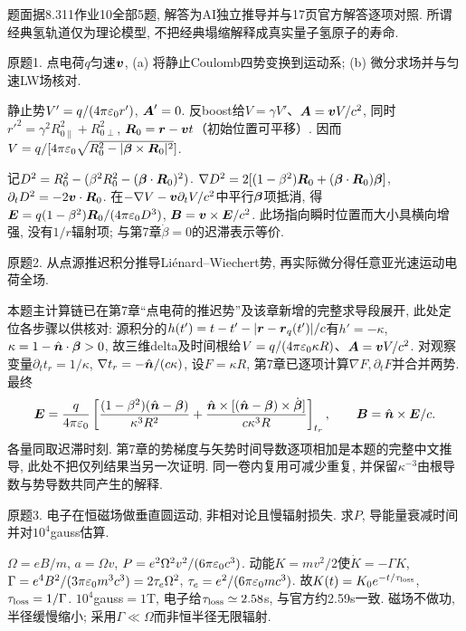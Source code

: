 题面据8.311作业10全部5题, 解答为AI独立推导并与17页官方解答逐项对照. 所谓经典氢轨道仅为理论模型, 不把经典塌缩解释成真实量子氢原子的寿命.
\begin{exercise}
原题1. 点电荷$q$匀速$\boldsymbol{v}$, (a) 将静止Coulomb四势变换到运动系; (b) 微分求场并与匀速LW场核对.
\end{exercise}
\begin{solution}
静止势$V'=q/(4\pi\varepsilon_0 r')$, $\boldsymbol{A}'=0$. 反boost给$V=\gamma V'$、$\boldsymbol{A}=\boldsymbol{v} V/c^2$, 同时$r'^2=\gamma^2R_{0\parallel}^2+R_{0\perp}^2$, $\boldsymbol{R}_0=\boldsymbol{r}-\boldsymbol{v}t$（初始位置可平移）. 因而$V=q/[4\pi\varepsilon_0\sqrt{R_0^2-|\boldsymbol{\beta}\times\boldsymbol{R}_0|^2}]$.

记$D^2=R_0^2-(\beta^2R_0^2-(\boldsymbol{\beta}\cdot\boldsymbol{R}_0)^2)$. $\nabla D^2=2[(1-\beta^2)\boldsymbol{R}_0+(\boldsymbol{\beta}\cdot\boldsymbol{R}_0)\boldsymbol{\beta}]$, $\partial_tD^2=-2\boldsymbol{v}\cdot\boldsymbol{R}_0$. 在$-\nabla V-\boldsymbol{v}\partial_tV/c^2$中平行$\boldsymbol{\beta}$项抵消, 得$\boldsymbol{E}=q(1-\beta^2)\boldsymbol{R}_0/(4\pi\varepsilon_0 D^3)$, $\boldsymbol{B}=\boldsymbol{v}\times\boldsymbol{E}/c^2$. 此场指向瞬时位置而大小具横向增强, 没有$1/r$辐射项; 与第7章$\dot\beta=0$的迟滞表示等价.
\end{solution}
\begin{exercise}
原题2. 从点源推迟积分推导Liénard--Wiechert势, 再实际微分得任意亚光速运动电荷全场.
\end{exercise}
\begin{solution}
本题主计算链已在第7章“点电荷的推迟势”及该章新增的完整求导段展开, 此处定位各步骤以供核对: 源积分的$h(t')=t-t'-|\boldsymbol{r}-\boldsymbol{r}_q(t')|/c$有$h'=-\kappa$, $\kappa=1-\hat{\boldsymbol{n}}\cdot\boldsymbol{\beta}>0$, 故三维delta及时间根给$V=q/(4\pi\varepsilon_0\kappa R)$、$\boldsymbol{A}=\boldsymbol{v}V/c^2$. 对观察变量$\partial_tt_r=1/\kappa$, $\nabla t_r=-\hat{\boldsymbol{n}}/(c\kappa)$, 设$F=\kappa R$, 第7章已逐项计算$\nabla F,\partial_tF$并合并两势. 最终
\[
\boldsymbol{E}=\frac q{4\pi\varepsilon_0}\left[\frac{(1-\beta^2)(\hat{\boldsymbol{n}}-\boldsymbol{\beta})}{\kappa^3R^2}+\frac{\hat{\boldsymbol{n}}\times[(\hat{\boldsymbol{n}}-\boldsymbol{\beta})\times\dot{\boldsymbol{\beta}}]}{c\kappa^3R}\right]_{t_r},\qquad\boldsymbol{B}=\hat{\boldsymbol{n}}\times\boldsymbol{E}/c.
\]
各量同取迟滞时刻. 第7章的势梯度与矢势时间导数逐项相加是本题的完整中文推导, 此处不把仅列结果当另一次证明. 同一卷内复用可减少重复, 并保留$\kappa^{-3}$由根导数与势导数共同产生的解释.
\end{solution}
\begin{exercise}
原题3. 电子在恒磁场做垂直圆运动, 非相对论且慢辐射损失. 求$P$, 导能量衰减时间并对$10^4$gauss估算.
\end{exercise}
\begin{solution}
$\Omega=eB/m$, $a=\Omega v$, $P=e^2\Omega^2v^2/(6\pi\varepsilon_0 c^3)$. 动能$K=mv^2/2$使$\dot K=-\Gamma K$, $\Gamma=e^4B^2/(3\pi\varepsilon_0 m^3c^3)=2\tau_e\Omega^2$, $\tau_e=e^2/(6\pi\varepsilon_0 mc^3)$. 故$K(t)=K_0e^{-t/\tau_{
\rm loss}}$, $\tau_{\rm loss}=1/\Gamma$. $10^4$gauss$=1$T, 电子给$\tau_{\rm loss}\simeq2.58$s, 与官方约2.59s一致. 磁场不做功, 半径缓慢缩小; 采用$\Gamma\ll\Omega$而非恒半径无限辐射.
\end{solution}
